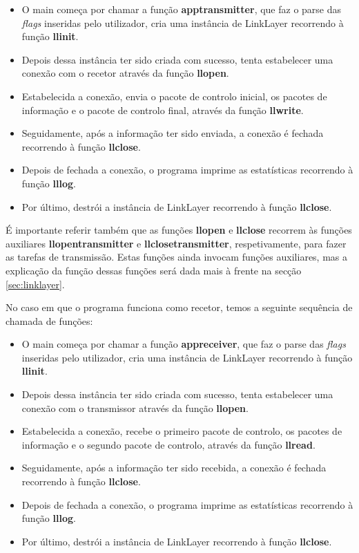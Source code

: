 \documentclass[11pt,a4paper,reqno]{article}
\numberwithin{equation}{section}
\begin{document}
\begin{itemize}
	\item O main começa por chamar a função \textbf{app\textunderscore transmitter}, que faz o parse das \textit{flags} inseridas pelo utilizador, cria uma instância de LinkLayer recorrendo à função \textbf{llinit}.
	\item Depois dessa instância ter sido criada com sucesso, tenta estabelecer uma conexão com o recetor através da função \textbf{llopen}.
	\item Estabelecida a conexão, envia o pacote de controlo inicial, os pacotes de informação e o pacote de controlo final, através da função \textbf{llwrite}.
	\item Seguidamente, após a informação ter sido enviada, a conexão é fechada recorrendo à função \textbf{llclose}.
	\item Depois de fechada a conexão, o programa imprime as estatísticas recorrendo à função \textbf{lllog}.
	\item Por último, destrói a instância de LinkLayer recorrendo à função \textbf{llclose}.
\end{itemize}

\vspace{5mm}

É importante referir também que as funções \textbf{llopen} e \textbf{llclose} recorrem às funções auxiliares \textbf{llopen\textunderscore transmitter} e \textbf{llclose\textunderscore transmitter}, respetivamente, para fazer as tarefas de transmissão. Estas funções ainda invocam funções auxiliares, mas a explicação da função dessas funções será dada mais à frente na secção \ref{sec:linklayer}.

\vspace{5mm}

No caso em que o programa funciona como recetor, temos a seguinte sequência de chamada de funções:

\begin{itemize}
	\item O main começa por chamar a função \textbf{app\textunderscore receiver}, que faz o parse das \textit{flags} inseridas pelo utilizador, cria uma instância de LinkLayer recorrendo à função \textbf{llinit}.
	\item Depois dessa instância ter sido criada com sucesso, tenta estabelecer uma conexão com o transmissor através da função \textbf{llopen}.
	\item Estabelecida a conexão, recebe o primeiro pacote de controlo, os pacotes de informação e o segundo pacote de controlo, através da função \textbf{llread}.
	\item Seguidamente, após a informação ter sido recebida, a conexão é fechada recorrendo à função \textbf{llclose}.
	\item Depois de fechada a conexão, o programa imprime as estatísticas recorrendo à função \textbf{lllog}.
	\item Por último, destrói a instância de LinkLayer recorrendo à função \textbf{llclose}.
\end{itemize}
\end{document}
